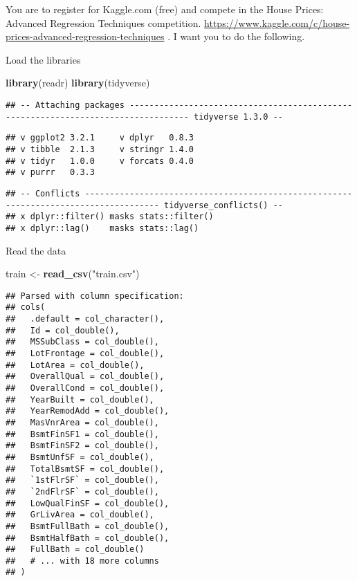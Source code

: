 \documentclass[]{article}
\newenvironment{Shaded}{\begin{snugshade}}{\end{snugshade}}
\newcommand{\KeywordTok}[1]{\textcolor[rgb]{0.13,0.29,0.53}{\textbf{#1}}}
\newcommand{\NormalTok}[1]{#1}
\newcommand{\StringTok}[1]{\textcolor[rgb]{0.31,0.60,0.02}{#1}}
\begin{document}
You are to register for Kaggle.com (free) and compete in the House
Prices: Advanced Regression Techniques competition.
\url{https://www.kaggle.com/c/house-prices-advanced-regression-techniques}
. I want you to do the following.

Load the libraries

\begin{Shaded}
\begin{Highlighting}[]
\KeywordTok{library}\NormalTok{(readr)}
\KeywordTok{library}\NormalTok{(tidyverse)}
\end{Highlighting}
\end{Shaded}

\begin{verbatim}
## -- Attaching packages ---------------------------------------------------------------------------------- tidyverse 1.3.0 --
\end{verbatim}

\begin{verbatim}
## v ggplot2 3.2.1     v dplyr   0.8.3
## v tibble  2.1.3     v stringr 1.4.0
## v tidyr   1.0.0     v forcats 0.4.0
## v purrr   0.3.3
\end{verbatim}

\begin{verbatim}
## -- Conflicts ------------------------------------------------------------------------------------- tidyverse_conflicts() --
## x dplyr::filter() masks stats::filter()
## x dplyr::lag()    masks stats::lag()
\end{verbatim}

Read the data

\begin{Shaded}
\begin{Highlighting}[]
\NormalTok{train <-}\StringTok{ }\KeywordTok{read_csv}\NormalTok{(}\StringTok{"train.csv"}\NormalTok{)}
\end{Highlighting}
\end{Shaded}

\begin{verbatim}
## Parsed with column specification:
## cols(
##   .default = col_character(),
##   Id = col_double(),
##   MSSubClass = col_double(),
##   LotFrontage = col_double(),
##   LotArea = col_double(),
##   OverallQual = col_double(),
##   OverallCond = col_double(),
##   YearBuilt = col_double(),
##   YearRemodAdd = col_double(),
##   MasVnrArea = col_double(),
##   BsmtFinSF1 = col_double(),
##   BsmtFinSF2 = col_double(),
##   BsmtUnfSF = col_double(),
##   TotalBsmtSF = col_double(),
##   `1stFlrSF` = col_double(),
##   `2ndFlrSF` = col_double(),
##   LowQualFinSF = col_double(),
##   GrLivArea = col_double(),
##   BsmtFullBath = col_double(),
##   BsmtHalfBath = col_double(),
##   FullBath = col_double()
##   # ... with 18 more columns
## )
\end{verbatim}
\end{document}
